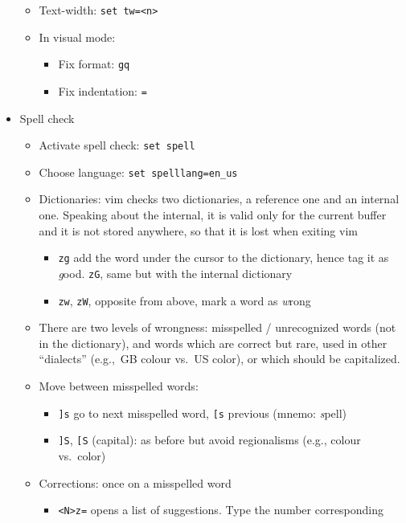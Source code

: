 \documentclass[a4paper,12pt,%
              final%
              ]{article}
\begin{document}
\begin{itemize}
\begin{itemize}
      \item Text-width: \verb|set tw=<n>|
      \item In visual mode:
        \begin{itemize}
          \item Fix format: \texttt{gq}
          \item Fix indentation: \texttt{=}
        \end{itemize}
    \end{itemize}
  \item Spell check
    \begin{itemize}
      \item Activate spell check: \verb|set spell|
      \item Choose language: \verb|set spelllang=en_us|
      \item Dictionaries: vim checks two dictionaries, a reference one and an
        internal one. Speaking about the internal, it is valid only for the current
        buffer and it is not stored anywhere, so that it is lost when exiting vim
        \begin{itemize}
          \item \verb|zg| add the word under the cursor to the dictionary, hence tag
            it as \emph{g}ood. \verb|zG|, same but with the internal dictionary
          \item \verb|zw|, \verb|zW|, opposite from above, mark a word as
            \emph{w}rong
        \end{itemize}
      \item There are two levels of wrongness: misspelled / unrecognized words (not
        in the dictionary), and words which are correct but rare, used in other
        ``dialects'' (e.g.,\ GB colour vs.\ US color), or which should be capitalized.
      \item Move between misspelled words:
        \begin{itemize}
          \item \verb|]s| go to next misspelled word, \verb|[s| previous (mnemo:
            \emph{s}pell)
          \item \verb|]S|, \verb|[S| (capital): as before but avoid regionalisms
            (e.g., colour vs.\ color)
        \end{itemize}
      \item Corrections: once on a misspelled word
        \begin{itemize}
          \item \verb|<N>z=| opens a list of suggestions. Type the number corresponding

\end{itemize}
\end{itemize}
\end{itemize}
\end{document}

